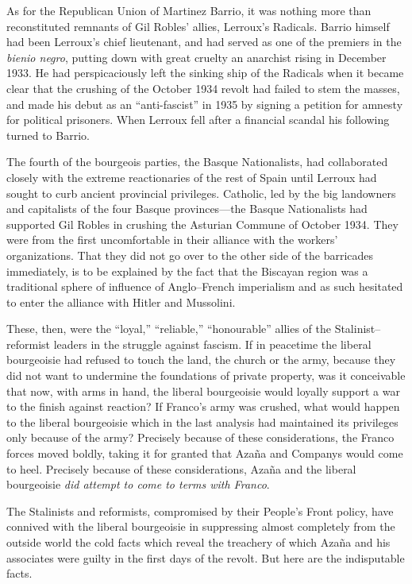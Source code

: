 As for the Republican Union of Martinez Barrio\indexDBarrio, it was nothing more than reconstituted remnants of Gil Robles’ allies, Lerroux’s Radicals. Barrio himself had been Lerroux’s chief lieutenant, and had served as one of the premiers in the \emph{bienio negro}, putting down with great cruelty an anarchist rising in December 1933. He had perspicaciously left the sinking ship of the Radicals when it became clear that the crushing of the October 1934 revolt had failed to stem the masses, and made his debut as an ``anti-fascist'' in 1935 by signing a petition for amnesty for political prisoners. When Lerroux{\indexALerroux} fell after a financial scandal his following turned to Barrio.
\nowidow

The fourth of the bourgeois parties, the Basque Nationalists, had collaborated closely with the extreme reactionaries of the rest of Spain until Lerroux had sought to curb ancient provincial privileges. Catholic, led by the big landowners and capitalists of the four Basque provinces---the Basque Nationalists had supported Gil Robles in crushing the Asturian Commune of October 1934. They were from the first uncomfortable in their alliance with the workers’ organizations. That they did not go over to the other side of the barricades immediately, is to be explained by the fact that the Biscayan region was a traditional sphere of influence of Anglo--French imperialism and as such hesitated to enter the alliance with Hitler and Mussolini.

These, then, were the ``loyal,'' ``reliable,'' ``honourable'' allies of the Stalinist--reformist leaders in the struggle against fascism. If in peacetime the liberal bourgeoisie had refused to touch the land, the church or the army, because they did not want to undermine the foundations of private property, was it conceivable that now, with arms in hand, the liberal bourgeoisie would loyally support a war to the finish against reaction? If Franco’s army was crushed, what would happen to the liberal bourgeoisie which in the last analysis had maintained its privileges only because of the army? Precisely because of these considerations, the Franco forces moved boldly, taking it for granted that Azaña and Companys would come to heel. Precisely because of these considerations, Azaña and the liberal bourgeoisie \emph{did attempt to come to terms with Franco}.

The Stalinists and reformists, compromised by their People’s Front policy, have connived with the liberal bourgeoisie in suppressing almost completely from the outside world the cold facts which reveal the treachery of which Azaña and his associates were guilty in the first days of the revolt. But here are the indisputable facts.
\nowidow

